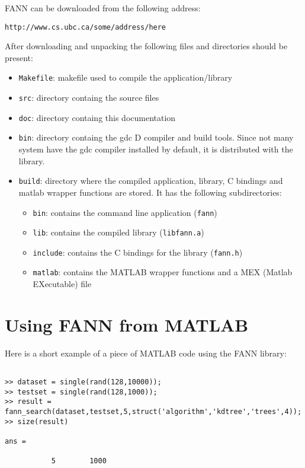 \documentclass[letter,10pt]{article}
\begin{document}
FANN can be downloaded from the following address:
\begin{center}
\texttt{http://www.cs.ubc.ca/some/address/here}
\end{center}

After downloading and unpacking the following files and directories should be present:
\begin{itemize}
\item \texttt{Makefile}: makefile used to compile the application/library
\item \texttt{src}: directory containg the source files
\item \texttt{doc}: directory containg this documentation
\item \texttt{bin}: directory containg the gdc D compiler and build tools. Since not many system have the gdc compiler installed by default, it is distributed with the library.
\item \texttt{build}: directory where the compiled application, library, C bindings and matlab wrapper functions are stored. It has the following subdirectories:
\begin{itemize}
\item \texttt{bin}: contains the command line application (\texttt{fann})
\item \texttt{lib}: contains the compiled library (\texttt{libfann.a})
\item \texttt{include}: contains the C bindings for the library (\texttt{fann.h})
\item \texttt{matlab}: contains the MATLAB wrapper functions and a MEX (Matlab EXecutable) file
\end{itemize}



\end{itemize}

\section{Using FANN from MATLAB}

Here is a short example of a piece of MATLAB code using the FANN library:
\begin{Verbatim}[fontsize=\footnotesize,frame=single]

>> dataset = single(rand(128,10000));
>> testset = single(rand(128,1000));
>> result = fann_search(dataset,testset,5,struct('algorithm','kdtree','trees',4));
>> size(result)

ans =

           5        1000
\end{Verbatim}
\end{document}
